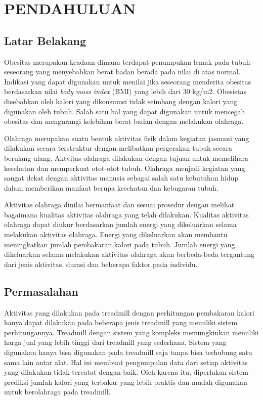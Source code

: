 \chapter{PENDAHULUAN}
\label{chap:pendahuluan}


\section{Latar Belakang}
\label{sec:latarbelakang}

Obesitas merupakan keadaan dimana terdapat penumpukan lemak pada tubuh seseorang yang menyebabkan berat badan berada pada nilai di atas normal. Indikasi yang dapat digunakan untuk menilai jika seseorang menderita obesitas berdasarkan nilai \emph{body mass index} (BMI) yang lebih dari 30 kg/m2. Obesistas disebabkan oleh kalori yang dikonsumsi tidak seimbang dengan kalori yang digunakan oleh tubuh. Salah satu hal yang dapat digunakan untuk mencegah obesitas dan mengurangi kelebihan berat badan dengan melakukan olahraga.

Olahraga merupakan suatu bentuk aktivitas fisik dalam kegiatan jasmani yang dilakukan secara terstruktur dengan melibatkan pergerakan tubuh secara berulang-ulang. Aktvitas olahraga dilakukan dengan tujuan untuk memelihara kesehatan dan memperkuat otot-otot tubuh. Olahraga menjadi kegiatan yang sangat dekat dengan aktivitas manusia sebagai salah satu kebutuhan hidup dalam memberikan manfaat berupa kesehatan dan kebugaran tubuh. 

Aktivitas olahraga dinilai bermanfaat dan sesuai prosedur dengan melihat bagaimana kualitas aktivitas olahraga yang telah dilakukan. Kualitas aktivitas olahraga dapat diukur berdasarkan jumlah energi yang dikeluarkan selama melakukan aktivitas olahraga. Energi yang dikeluarkan akan membantu meningkatkan jumlah pembakaran kalori pada tubuh. Jumlah energi yang dikeluarkan selama melakukan aktivitas olahraga akan berbeda-beda tergantung dari jenis aktivitas, durasi dan beberapa faktor pada individu.


\section{Permasalahan}
\label{sec:permasalahan}

Aktivitas yang dilakukan pada treadmill dengan perhitungan pembakaran kalori hanya dapat dilakukan pada beberapa jenis treadmill yang memiliki sistem perhitungannya. Treadmill dengan sistem yang kompleks memungkinkan memiliki harga jual yang lebih tinggi dari treadmill yang sederhana. Sistem yang digunakan hanya bisa digunakan pada treadmill saja tanpa bisa terhubung satu sama lain antar alat. Hal ini membuat pengumpulan data dari setiap aktivitas yang dilakukan tidak tercatat dengan baik. Oleh karena itu, diperlukan sistem prediksi jumlah kalori yang terbakar yang lebih praktis dan mudah digunakan untuk berolahraga pada treadmill. 


